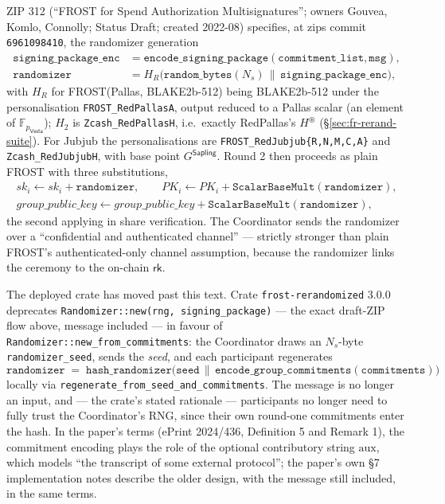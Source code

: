 \documentclass[11pt,a4paper]{article}
\theoremstyle{definition}
\newcommand{\F}{\mathbb{F}}
\newcommand{\rk}{\mathsf{rk}}
\newcommand{\Vesta}{\ensuremath{\mathsf{Vesta}}}
\begin{document}
ZIP 312 (``FROST for Spend Authorization Multisignatures''; owners Gouvea,
Komlo, Connolly; Status Draft; created 2022-08) specifies, at zips commit
\texttt{6961098410}, the randomizer generation
\begin{align*}
\mathtt{signing\_package\_enc} &=
  \mathtt{encode\_signing\_package}(\mathtt{commitment\_list},
  \mathtt{msg}), \\
\mathtt{randomizer} &= H_R\bigl(\mathtt{random\_bytes}(N_s) \,\|\,
  \mathtt{signing\_package\_enc}\bigr),
\end{align*}
with $H_R$ for FROST(Pallas, BLAKE2b-512) being BLAKE2b-512 under the
personalisation \texttt{FROST\_RedPallasA}, output reduced to a Pallas
scalar
(an element of $\F_{p_{\Vesta}}$); $H_2$ is \texttt{Zcash\_RedPallasH},
i.e.\ exactly RedPallas's $H^{\circledast}$
(\S\ref{sec:fr-rerand-suite}). For Jubjub the personalisations are
\texttt{FROST\_RedJubjub\{R,N,M,C,A\}} and \texttt{Zcash\_RedJubjubH},
with base point $G^{\mathsf{Sapling}}$. Round 2 then proceeds as plain
FROST with three substitutions,
\begin{gather*}
sk_i \gets sk_i + \mathtt{randomizer}, \qquad
PK_i \gets PK_i + \mathtt{ScalarBaseMult}(\mathtt{randomizer}), \\
\mathit{group\_public\_key} \gets \mathit{group\_public\_key} +
\mathtt{ScalarBaseMult}(\mathtt{randomizer}),
\end{gather*}
the second applying in share verification. The
Coordinator sends the randomizer over a ``confidential and authenticated
channel'' --- strictly stronger than plain FROST's authenticated-only
channel assumption, because the randomizer links the ceremony to the
on-chain $\rk$.

The deployed crate has moved past this text. Crate
\texttt{frost-rerandomized} 3.0.0 deprecates
\texttt{Randomizer::new(rng, signing\_package)} --- the exact draft-ZIP
flow above, message included --- in favour of
\texttt{Randomizer::new\_from\_commitments}: the Coordinator draws an
$N_s$-byte \texttt{randomizer\_seed}, sends the \emph{seed}, and each
participant regenerates
\[
\mathtt{randomizer} \;=\; \mathtt{hash\_randomizer}\bigl(\mathtt{seed}
\,\|\, \mathtt{encode\_group\_commitments}(\mathtt{commitments})\bigr)
\]
locally via \texttt{regenerate\_from\_seed\_and\_commitments}. The message
is no longer an input, and --- the crate's stated rationale ---
participants no longer need to fully trust the Coordinator's RNG, since
their own round-one commitments enter the hash. In the paper's terms
(ePrint 2024/436, Definition 5 and Remark 1), the commitment encoding
plays the role of the optional contributory string $\mathrm{aux}$, which
models ``the transcript of some external protocol''; the paper's own
\S7 implementation notes describe the older design, with the message
still included, in the same terms.
\end{document}
